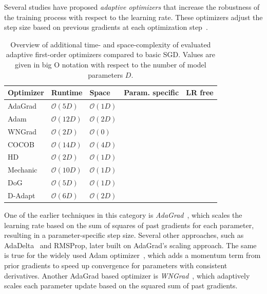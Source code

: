 \documentclass{article} %
\newcommand{\cmark}{\ding{51}} %
\newcommand{\xmark}{\ding{55}} %
\begin{document}
Several studies have proposed \textit{adaptive optimizers} that increase the robustness of the training process with respect to the learning rate.
These optimizers adjust the step size based on previous gradients at each optimization step~\citep{duchiAdaptiveSubgradientMethods2011}.

\begin{table}[ht]
   \centering
   \small
   \caption{
      Overview of additional time- and space-complexity of evaluated adaptive first-order optimizers compared to basic SGD.
      Values are given in big O notation with respect to the number of model parameters $D$.
   }\label{tab:param_free_optims}
   \begin{tabular}{@{}lllcc@{}}
      \toprule
      Optimizer                & Runtime            & Space             & Param. specific & LR free \\ \midrule
      AdaGrad                  & $\mathcal{O}(5D)$  & $\mathcal{O}(1D)$ & \cmark          & \xmark  \\
      Adam                     & $\mathcal{O}(12D)$ & $\mathcal{O}(2D)$ & \cmark          & \xmark  \\
      WNGrad                   & $\mathcal{O}(2D)$  & $\mathcal{O}(0)$  & \xmark          & \xmark  \\
      COCOB                    & $\mathcal{O}(14D)$ & $\mathcal{O}(4D)$ & \cmark          & \cmark  \\
      HD\footnotemark[1]       & $\mathcal{O}(2D)$  & $\mathcal{O}(1D)$ & \xmark          & \xmark  \\
      Mechanic\footnotemark[1] & $\mathcal{O}(10D)$ & $\mathcal{O}(1D)$ & \cmark          & \cmark  \\
      DoG                      & $\mathcal{O}(5D)$  & $\mathcal{O}(1D)$ & \xmark          & \cmark  \\
      D-Adapt\footnotemark[1]  & $\mathcal{O}(6D)$  & $\mathcal{O}(2D)$ & \xmark          & \cmark  \\
      \bottomrule
   \end{tabular}
\end{table}

One of the earlier techniques in this category is \textit{AdaGrad}~\citep{duchiAdaptiveSubgradientMethods2011}, which scales the learning rate based on the sum of squares of past gradients for each parameter, resulting in a parameter-specific step size.
Several other approaches, such as AdaDelta~\citep{zeilerADADELTAAdaptiveLearning2012a} and RMSProp, later built on AdaGrad's scaling approach.
The same is true for the widely used Adam optimizer~\citep{kingmaAdamMethodStochastic2017b}, which adds a momentum term from prior gradients to speed up convergence for parameters with consistent derivatives.
Another AdaGrad based optimizer is \textit{WNGrad}~\citep{wuWNGradLearnLearning2020}, which adaptively scales each parameter update based on the squared sum of past gradients.
\end{document}
